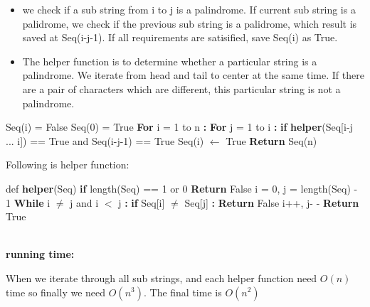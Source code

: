\documentclass[12pt]{article}
\begin{document}
\begin{itemize}
  \item we check if a sub string from i to j is a palindrome. 
	If current sub string is a palidrome, we check if the previous sub string is a palidrome, which result is saved at Seq(i-j-1).
	If all requirements are satisified, save Seq(i) as True.
  \item The helper function is to determine whether a particular string is a palindrome. 
	We iterate from head and tail to center at the same time. 
	If there are a pair of characters which are different, this particular string is not a palindrome.
\end{itemize}

\begin{algorithm}
\begin{algorithmic}
\State Seq(i) = False
\State Seq(0) = True
\State \textbf{For} i = 1 to n \textbf{:}
\State \hspace{0.4cm} \textbf{For} j = 1 to i \textbf{:}
\State \hspace{0.8cm} \textbf{if} \textbf{helper}(Seq[i-j ... i]) == True and Seq(i-j-1) == True
\State \hspace{1.2cm} Seq(i) $\leftarrow$ True
\State \textbf{Return} Seq(n)
\end{algorithmic}
\end{algorithm}
Following is helper function: 
\begin{algorithm}
\begin{algorithmic}
\State def \textbf{helper}(Seq)
\State \hspace{0.4cm} \textbf{if} length(Seq) == 1 or 0
\State \hspace{0.8cm} \textbf{Return} False
\State \hspace{0.4cm} i = 0, j = length(Seq) - 1
\State \hspace{0.4cm} \textbf{While} i $\not=$ j and i $<$ j \textbf{:} 
\State \hspace{0.8cm} \textbf{if} Seq[i] $\not=$ Seq[j] \textbf{:}
\State \hspace{1.2cm} \textbf{Return} False
\State \hspace{0.8cm} i++, j- -
\State \hspace{0.4cm} \textbf{Return} True
\end{algorithmic}
\end{algorithm}
\noindent \\
\textbf{running time:} \par 
When we iterate through all sub strings, and each helper function need $O(n)$ time so finally we need $O(n^3)$.
The final time is $O(n^2)$
\end{document}
